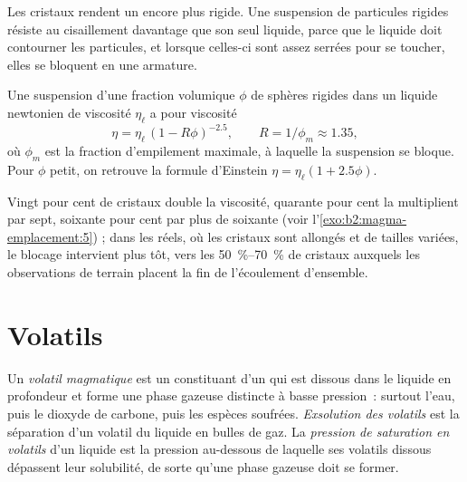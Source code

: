 Les cristaux rendent un  encore plus rigide. Une suspension de particules rigides résiste
au cisaillement davantage que son seul liquide, parce que le liquide doit contourner les
particules, et lorsque celles-ci sont assez serrées pour se toucher, elles se bloquent en une
armature.

\begin{proposition}\label{prop:b2:magma-emplacement:roscoe}
Une suspension d'une fraction volumique $\phi$ de sphères rigides dans un liquide newtonien
de viscosité $\eta_{\ell}$ a pour viscosité
\[
\eta = \eta_{\ell}\,(1 - R\phi)^{-2.5}, \qquad R = 1/\phi_m \approx 1.35,
\]
où $\phi_m$ est la fraction d'empilement maximale, à laquelle la suspension se bloque. Pour
$\phi$ petit, on retrouve la formule d'Einstein $\eta = \eta_{\ell}(1 + 2.5\phi)$.
\end{proposition}
\admitted

Vingt pour cent de cristaux double la viscosité, quarante pour cent la multiplient par
sept, soixante pour cent par plus de soixante (voir l'\cref{exo:b2:magma-emplacement:5}) ; dans les  réels, où les
cristaux sont allongés et de tailles variées, le blocage intervient plus tôt, vers les
\qtyrange{50}{70}{\percent} de cristaux auxquels les observations de terrain placent la
fin de l'écoulement d'ensemble.

\section{Volatils}

\begin{definition}\label{def:b2:magma-emplacement:volatiles}
Un \emph{volatil magmatique} est un constituant d'un  qui
est dissous dans le liquide en profondeur et forme une phase gazeuse distincte à basse
pression~: surtout l'eau, puis le dioxyde de carbone, puis les espèces soufrées. \emph{Exsolution
des volatils} est la séparation d'un volatil du
liquide en bulles de gaz. La \emph{pression de saturation
en volatils} d'un liquide est la pression au-dessous de laquelle ses
volatils dissous dépassent leur solubilité, de sorte qu'une phase gazeuse doit se former.
\end{definition}


